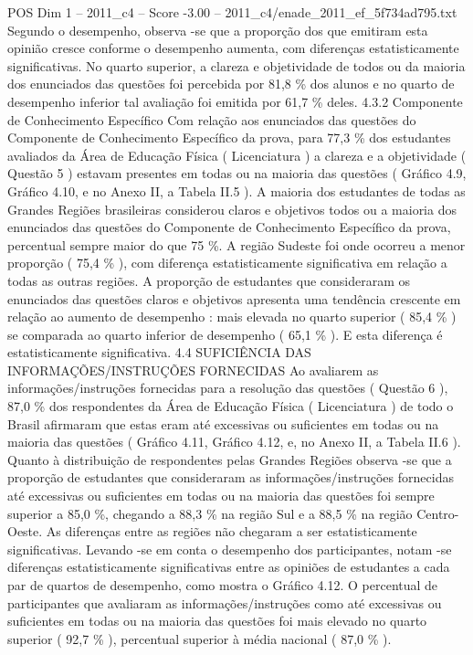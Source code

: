 \begin{textsample}{POS Dim 1 – 2011\_c4 – Score -3.00 – 2011\_c4/enade\_2011\_ef\_5f734ad795.txt}
Segundo o desempenho, observa -se que a proporção dos que emitiram esta opinião cresce conforme o desempenho aumenta, com diferenças estatisticamente significativas.
No quarto superior, a clareza e objetividade de todos ou da maioria dos enunciados das questões foi percebida por 81,8 \% dos alunos e no quarto de desempenho inferior tal avaliação foi emitida por 61,7 \% deles. 4.3.2 Componente de Conhecimento Específico Com relação aos enunciados das questões do Componente de Conhecimento Específico da prova, para 77,3 \% dos estudantes avaliados da Área de Educação Física ( Licenciatura ) a clareza e a objetividade ( Questão 5 ) estavam presentes em todas ou na maioria das questões ( Gráfico 4.9, Gráfico 4.10, e no Anexo II, a Tabela II.5 ).
A maioria dos estudantes de todas as Grandes Regiões brasileiras considerou claros e objetivos todos ou a maioria dos enunciados das questões do Componente de Conhecimento Específico da prova, percentual sempre maior do que 75 \%.
A região Sudeste foi onde ocorreu a menor proporção ( 75,4 \% ), com diferença estatisticamente significativa em relação a todas as outras regiões.
A proporção de estudantes que consideraram os enunciados das questões claros e objetivos apresenta uma tendência crescente em relação ao aumento de desempenho : mais elevada no quarto superior ( 85,4 \% ) se comparada ao quarto inferior de desempenho ( 65,1 \% ).
E esta diferença é estatisticamente significativa. 4.4 SUFICIÊNCIA DAS INFORMAÇÕES/INSTRUÇÕES FORNECIDAS Ao avaliarem as informações/instruções fornecidas para a resolução das questões ( Questão 6 ), 87,0 \% dos respondentes da Área de Educação Física ( Licenciatura ) de todo o Brasil afirmaram que estas eram até excessivas ou suficientes em todas ou na maioria das questões ( Gráfico 4.11, Gráfico 4.12, e, no Anexo II, a Tabela II.6 ).
Quanto à distribuição de respondentes pelas Grandes Regiões observa -se que a proporção de estudantes que consideraram as informações/instruções fornecidas até excessivas ou suficientes em todas ou na maioria das questões foi sempre superior a 85,0 \%, chegando a 88,3 \% na região Sul e a 88,5 \% na região Centro-Oeste.
As diferenças entre as regiões não chegaram a ser estatisticamente significativas.
Levando -se em conta o desempenho dos participantes, notam -se diferenças estatisticamente significativas entre as opiniões de estudantes a cada par de quartos de desempenho, como mostra o Gráfico 4.12.
O percentual de participantes que avaliaram as informações/instruções como até excessivas ou suficientes em todas ou na maioria das questões foi mais elevado no quarto superior ( 92,7 \% ), percentual superior à média nacional ( 87,0 \% ).

\end{textsample}
